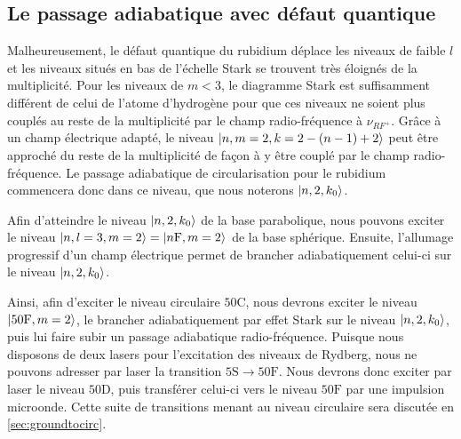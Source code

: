  \subsection{Le passage adiabatique avec défaut quantique}\label{subsec:adiab_Qdefect}
\noindent Malheureusement, le défaut quantique du rubidium déplace les niveaux de faible $l$ et les niveaux situés en bas de l'échelle Stark se trouvent très éloignés de la multiplicité.
Pour les niveaux de $m<3$, le diagramme Stark est suffisamment différent de celui de l'atome d'hydrogène pour que ces niveaux ne soient plus couplés au reste de la multiplicité par le champ radio-fréquence à $\nu_{RF^+}$.
Grâce à un champ électrique adapté, le niveau $\ket{n,m=2,k=2-(n-1)+2}$ peut être approché du reste de la multiplicité de façon à y être couplé par le champ radio-fréquence.
Le passage adiabatique de circularisation pour le rubidium %
commencera donc dans ce niveau, que nous noterons $\ket{n,2,k_0}$.


Afin d'atteindre le niveau $\ket{n,2,k_0}$ de la base parabolique, nous pouvons exciter le niveau $\ket{n,l=3,m=2}=\ket{n\mathrm{F},m=2}$ de la base sphérique.
Ensuite, l'allumage progressif d'un champ électrique permet de brancher adiabatiquement celui-ci sur le niveau $\ket{n,2,k_0}$.


Ainsi, afin d'exciter le niveau circulaire $\mathrm{50C}$, nous devrons exciter le niveau \linebreak $\ket{\mathrm{50F},m=2}$, le brancher adiabatiquement par effet Stark sur le niveau $\ket{n,2,k_0}$, puis lui faire subir un passage adiabatique radio-fréquence.
Puisque nous disposons de deux lasers pour l'excitation des niveaux de Rydberg, nous ne pouvons adresser par laser la transition $\mathrm{5S}\rightarrow\mathrm{50F}$.
Nous devrons donc exciter par laser le niveau $\mathrm{50D}$, puis transférer celui-ci vers le niveau $\mathrm{50F}$ par une impulsion microonde.
Cette suite de transitions menant au niveau circulaire sera discutée en \ref{sec:groundtocirc}.

